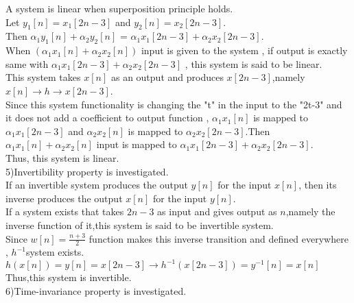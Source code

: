 \documentclass[10pt,a4paper, margin=1in]{article}
\begin{document}
\begin{enumerate}
\begin{enumerate}
 	A system is linear when superposition principle holds.\\
 	
 	Let $y_1[n] = x_1[2n-3]$ and  $y_2[n] = x_2[2n-3]$.\\
 	
 	Then $\alpha_1 y_1[n] + \alpha_2 y_2[n]$ = $\alpha_1 x_1[2n-3] + \alpha_2 x_2[2n-3]$.\\
 	
 	When $(\alpha_1 x_1[n] + \alpha_2 x_2[n])$ input is given to the system , if output is exactly same with $\alpha_1 x_1[2n-3] + \alpha_2 x_2[2n-3]$ , this system is said to be linear.\\
 	
 	This system takes $x[n]$ as an output and produces $x[2n-3]$,namely $x[n] \rightarrow h \rightarrow x[2n-3]$.\\
 	Since this system functionality is changing the "t" in the input to the "2t-3" and it does not add a coefficient to output function , $\alpha_1 x_1[n]$ is mapped to $\alpha_1 x_1[2n-3] $ and $\alpha_2 x_2[n]$ is mapped to $\alpha_2 x_2[2n-3]$.Then $\alpha_1 x_1[n] + \alpha_2 x_2[n]$ input is mapped to $\alpha_1 x_1[2n-3] + \alpha_2 x_2[2n-3]$.\\
 	
 	Thus, this system is linear.\\
 	
 	5)Invertibility property is investigated.\\
 	
 	
 	If an invertible system produces the output $y[n]$ for the input $x[n]$, then its inverse produces the output $x[n]$ for the input $y[n]$.\\
	
	If a system exists that takes $2n-3$ as input and gives output as $n$,namely the inverse function of it,this system is said to be invertible system.\\
	
	Since $w[n] = \frac{n+3}{2}$ function makes this inverse transition and defined everywhere , $h^{-1} $system exists.\\
	
	$h(x[n])=y[n]=x[2n-3] \rightarrow h^{-1}(x[2n-3])=y^{-1}[n]=x[n]$\\
	
	Thus,this system is invertible.\\
 	
 	6)Time-invariance property is investigated.\\
 	

\end{enumerate}
\end{enumerate}
\end{document}
